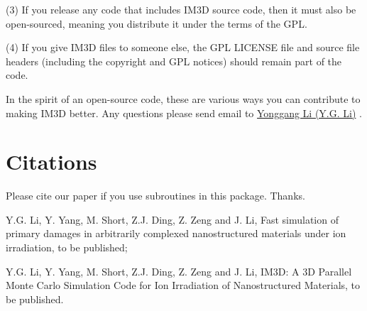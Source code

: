 (3) If you release any code that includes IM3D source code, then it must also be open-sourced, meaning you distribute it under the terms of the GPL.

(4) If you give IM3D files to someone else, the GPL LICENSE file and source file headers (including the copyright and GPL notices) should remain part of the code.

In the spirit of an open-source code, these are various ways you can contribute to making IM3D better. Any questions please send email to \href{ygli@theory.issp.ac.cn}{Yonggang Li (Y.G. Li)} .


\section{Citations}

Please cite our paper if you use subroutines in this package. Thanks.

Y.G. Li, Y. Yang, M. Short, Z.J. Ding, Z. Zeng and J. Li, Fast simulation of primary damages in arbitrarily complexed nanostructured materials under ion irradiation, to be published;

Y.G. Li, Y. Yang, M. Short, Z.J. Ding, Z. Zeng and J. Li, IM3D: A 3D Parallel Monte Carlo Simulation Code for Ion Irradiation of Nanostructured Materials, to be published.


